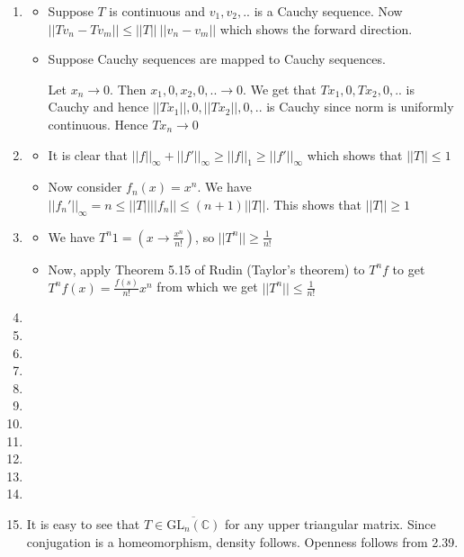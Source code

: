 \documentclass{article}
\begin{document}
\begin{enumerate}
    \begin{proof}
    Suppose $||x-v+W||<1-||v||$. Then we get $||x-v+w||<1-||v||$. Now $||x+w|| \leq ||x-v+w||+||v||<1$. We also have $\pi(x+w)=x+W$
    \end{proof}

    \item \begin{itemize}
        \item Suppose $T$ is continuous and $v_1,v_2,..$ is a Cauchy sequence. Now $||Tv_n-Tv_m|| \leq ||T|| \ ||v_n-v_m||$ which shows the forward direction.

        \item     Suppose Cauchy sequences are mapped to Cauchy sequences. 
        
        Let $x_n \to 0$. Then $x_1,0,x_2,0,.. \to 0$. We get that $Tx_1,0,Tx_2,0,..$ is Cauchy and hence $||Tx_1||,0,||Tx_2||,0,..$ is Cauchy since norm is uniformly continuous. Hence $Tx_n \to 0$ 
    \end{itemize}
    
    
    


    \item \begin{itemize}
        \item  It is clear that $||f||_\infty+||f'||_\infty \geq ||f||_1 \geq ||f'||_\infty$ which shows that $||T|| \leq 1$

        \item   Now consider $f_n(x)=x^n$. We have $||f_n'||_\infty=n \leq ||T||||f_n||\leq (n+1)||T||$. This shows that $||T|| \geq 1$
    \end{itemize}
    
   
    
  

    \item \begin{itemize}
        \item  We have $T^n1=(x \to \frac{x^n}{n!})$, so $||T^n|| \geq \frac{1}{n!}$

        \item   Now, apply Theorem 5.15 of Rudin (Taylor's theorem) to $T^nf$ to get $T^nf(x)=\frac{f(s)}{n!}x^n$ from which we get $||T^n|| \leq \frac{1}{n!}$
    \end{itemize}
    
    \item 
    \item 
    \item
    \item
    \item
    \item
    \item
    \item
    \item
    \item
    \item
    \item It is easy to see that $T \in \overline{\text{GL}_n(\mathbb{C})}$ for any upper triangular matrix. Since conjugation is a homeomorphism, density follows. Openness follows from 2.39.


\end{enumerate}
\end{document}
